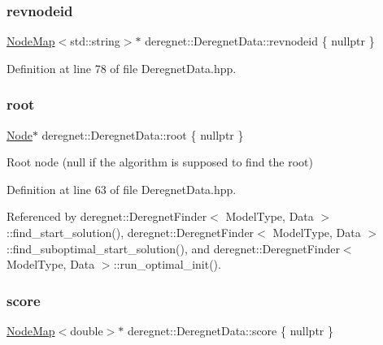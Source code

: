 \subsubsection{\texorpdfstring{revnodeid}{revnodeid}}
{\footnotesize\ttfamily \hyperlink{namespacederegnet_ae102b707ae1d6f83c639ece5e0dd5658}{Node\+Map}$<$std\+::string$>$$\ast$ deregnet\+::\+Deregnet\+Data\+::revnodeid \{ nullptr \}\hspace{0.3cm}{\ttfamily [private]}}



Definition at line 78 of file Deregnet\+Data.\+hpp.

\mbox{\label{classderegnet_1_1DeregnetData_a51a22fd88f929b1b1a00edb409b4cd55}} 
\subsubsection{\texorpdfstring{root}{root}}
{\footnotesize\ttfamily \hyperlink{namespacederegnet_a744bad34f2de9856d36715a445f027f3}{Node}$\ast$ deregnet\+::\+Deregnet\+Data\+::root \{ nullptr \}}



Root node (null if the algorithm is supposed to find the root) 



Definition at line 63 of file Deregnet\+Data.\+hpp.



Referenced by deregnet\+::\+Deregnet\+Finder$<$ Model\+Type, Data $>$\+::find\+\_\+start\+\_\+solution(), deregnet\+::\+Deregnet\+Finder$<$ Model\+Type, Data $>$\+::find\+\_\+suboptimal\+\_\+start\+\_\+solution(), and deregnet\+::\+Deregnet\+Finder$<$ Model\+Type, Data $>$\+::run\+\_\+optimal\+\_\+init().

\mbox{\label{classderegnet_1_1DeregnetData_a32970c8f43eb8be313ad08d829223b1f}} 
\subsubsection{\texorpdfstring{score}{score}}
{\footnotesize\ttfamily \hyperlink{namespacederegnet_ae102b707ae1d6f83c639ece5e0dd5658}{Node\+Map}$<$double$>$$\ast$ deregnet\+::\+Deregnet\+Data\+::score \{ nullptr \}}



